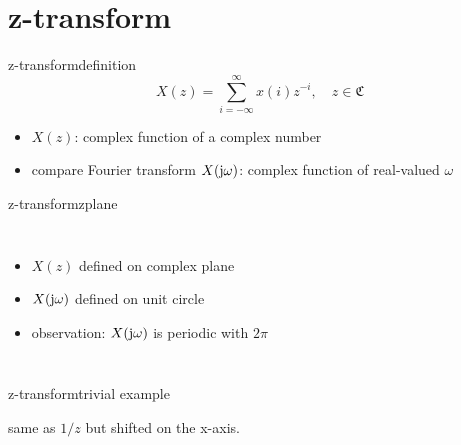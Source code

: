\section{z-transform}
	\begin{frame}{z-transform}{definition}
        \begin{equation*}
            X(z) = \sum\limits_{i=-\infty}^{\infty}{x(i)z^{-i}},\quad z\in \mathfrak{C}
        \end{equation*}
        \begin{itemize}
            \item<2->   $X(z)$: complex function of a complex number
            \bigskip
            \item<3->   compare Fourier transform $X(\mathrm{j}\omega)$: complex function of real-valued $\omega$
        \end{itemize}
	\end{frame}
	\begin{frame}{z-transform}{zplane}
        \vspace{-5mm}
        \begin{columns}
                \begin{itemize}
                    \item $X(z)$ defined on complex plane
                    \item   $X(\mathrm{j}\omega)$ defined on unit circle
                    \bigskip 
                    \item<3-> observation: $X(\mathrm{j}\omega)$ is periodic with $2\pi$
                \end{itemize}
        \end{columns}
	\end{frame}
	\begin{frame}{z-transform}{trivial example}
        \vspace{-3mm}
        
        
        same as $1/z$ but shifted on the x-axis.
        
	\end{frame}
